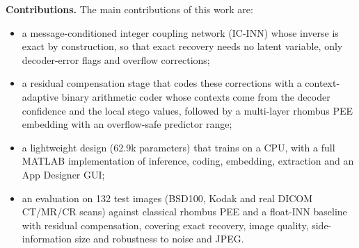 \textbf{Contributions.} The main contributions of this work are:
\begin{itemize}
\item a message-conditioned integer coupling network (IC-INN) whose inverse is exact by construction, so that
exact recovery needs no latent variable, only decoder-error flags and overflow corrections;
\item a residual compensation stage that codes these corrections with a context-adaptive binary arithmetic coder whose
contexts come from the decoder confidence and the local stego values, followed by a multi-layer rhombus PEE embedding
with an overflow-safe predictor range;
\item a lightweight design (62.9k parameters) that trains on a CPU, with a full MATLAB implementation of inference,
coding, embedding, extraction and an App Designer GUI;
\item an evaluation on 132 test images (BSD100, Kodak and real DICOM CT/MR/CR scans) against classical rhombus PEE and a
float-INN baseline with residual compensation, covering exact recovery, image quality, side-information size and
robustness to noise and JPEG.
\end{itemize}
